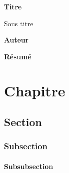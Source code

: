 \documentclass[a4paper,11pt]{report}    %
\begin{document}


\thispagestyle{plain}
\begin{center}
    \Large
    \textbf{Titre}
        
    \vspace{0.4cm}
    \large
    Sous titre
        
    \vspace{0.4cm}
    \textbf{Auteur}
       
    \vspace{0.9cm}
    \textbf{Résumé}
\end{center}

\blindtext



\newpage
\tableofcontents

\glsaddall  %
\printglossaries

\newpage
\printnomenclature



\newpage
\chapter{Chapitre}

\section{Section}

\blindtext

\subsection{Subsection}

\blindtext

\subsubsection{Subsubsection}
\end{document}
